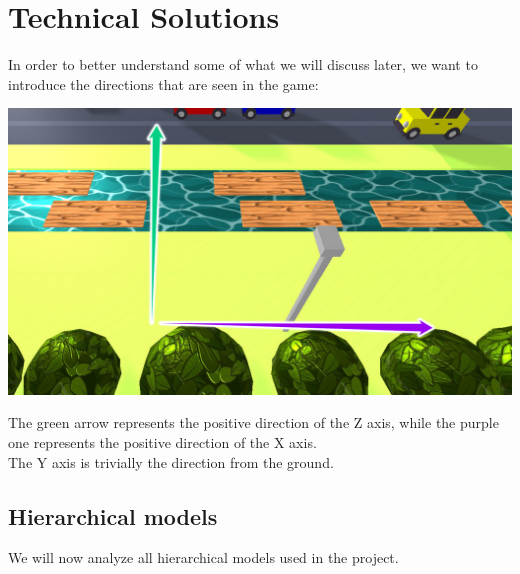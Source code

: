\documentclass[a4paper, 11pt]{article}
\begin{document}
\section{Technical Solutions}
In order to better understand some of what we will discuss later, we want to introduce the directions that are seen in the game:\\
\begin{center}
	\includegraphics[width =\linewidth]{axis.jpg}\\
\end{center}
The green arrow represents the positive direction of the Z axis, while the purple one represents the positive direction of the X axis.\\ The Y axis is trivially the direction from the ground.
\subsection{Hierarchical models}
We will now analyze all hierarchical models used in the project.
\end{document}
